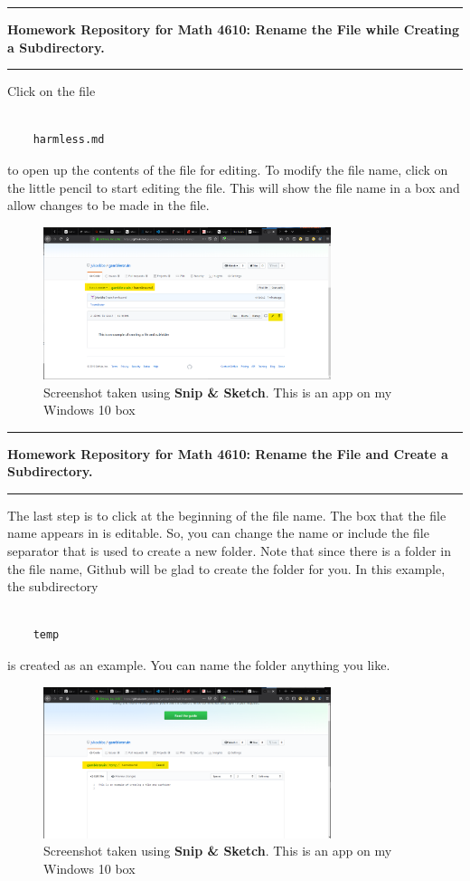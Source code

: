 \documentclass[10pt,fleqn]{article}
\begin{document}
\vskip0.1in\hrule\vskip0.1in
\noindent
{\bf Homework Repository for Math 4610: Rename the File while Creating a
 Subdirectory.} 
\vskip0.1in\hrule\vskip0.1in
Click on the file
\begin{verbatim}

    harmless.md

\end{verbatim}
to open up the contents of the file for editing. To modify the file name, click
on the little pencil to start editing the file. This will show the file name in
a box and allow changes to be made in the file.
\vfill
\begin{figure}[h]
\centering
\includegraphics[width=0.75\textwidth]{../images/github_10.png}
\caption{{Screenshot} taken using {\bf Snip \& Sketch}. This is an app on
         my Windows 10 box}
\end{figure}
\eject
\vskip0.1in\hrule\vskip0.1in
\noindent
{\bf Homework Repository for Math 4610: Rename the File and Create a
 Subdirectory.} 
\vskip0.1in\hrule\vskip0.1in
The last step is to click at the beginning of the file name. The box that the
file name appears in is editable. So, you can change the name or include the
file separator that is used to create a new folder. Note that since there is
a folder in the file name, Github will be glad to create the folder for you.
In this example, the subdirectory
\begin{verbatim}

    temp

\end{verbatim}
is created as an example. You can name the folder anything you like.
\vfill
\begin{figure}[h]
\centering
\includegraphics[width=0.75\textwidth]{../images/github_11.png}
\caption{{Screenshot} taken using {\bf Snip \& Sketch}. This is an app on
         my Windows 10 box}
\end{figure}
\end{document}
